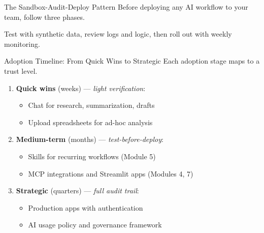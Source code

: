 \documentclass[aspectratio=169]{beamer}
\begin{document}
\begin{frame}{The Sandbox-Audit-Deploy Pattern}
Before deploying any AI workflow to your team, follow three phases.
\vspace{0.3cm}
\begin{center}
\end{center}
\vspace{0.3cm}
Test with synthetic data, review logs and logic, then roll out with weekly monitoring.
\end{frame}

\begin{frame}{Adoption Timeline: From Quick Wins to Strategic}
Each adoption stage maps to a trust level.
\vspace{0.3cm}
\begin{enumerate}
  \item \textbf{Quick wins} (weeks) --- \textit{light verification}:
  \begin{itemize}\small
    \item Chat for research, summarization, drafts
    \item Upload spreadsheets for ad-hoc analysis
  \end{itemize}
  \item \textbf{Medium-term} (months) --- \textit{test-before-deploy}:
  \begin{itemize}\small
    \item Skills for recurring workflows (Module 5)
    \item MCP integrations and Streamlit apps (Modules 4, 7)
  \end{itemize}
  \item \textbf{Strategic} (quarters) --- \textit{full audit trail}:
  \begin{itemize}\small
    \item Production apps with authentication
    \item AI usage policy and governance framework
  \end{itemize}
\end{enumerate}
\end{frame}
\end{document}
